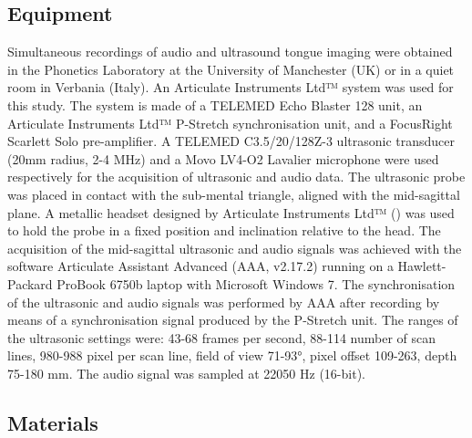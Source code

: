 \documentclass[12pt,]{article}
\begin{document}
\hypertarget{equipment}{%
\subsection{Equipment}\label{equipment}}

\label{s:equipment}

Simultaneous recordings of audio and ultrasound tongue imaging were
obtained in the Phonetics Laboratory at the University of Manchester
(UK) or in a quiet room in Verbania (Italy). An Articulate Instruments
Ltd™ system was used for this study. The system is made of a TELEMED
Echo Blaster 128 unit, an Articulate Instruments Ltd™ P-Stretch
synchronisation unit, and a FocusRight Scarlett Solo pre-amplifier. A
TELEMED C3.5/20/128Z-3 ultrasonic transducer (20mm radius, 2-4 MHz) and
a Movo LV4-O2 Lavalier microphone were used respectively for the
acquisition of ultrasonic and audio data. The ultrasonic probe was
placed in contact with the sub-mental triangle, aligned with the
mid-sagittal plane. A metallic headset designed by Articulate
Instruments Ltd™ (\citeyear{articulate2008}) was used to hold the probe
in a fixed position and inclination relative to the head. The
acquisition of the mid-sagittal ultrasonic and audio signals was
achieved with the software Articulate Assistant Advanced (AAA, v2.17.2)
running on a Hawlett-Packard ProBook 6750b laptop with Microsoft Windows
7. The synchronisation of the ultrasonic and audio signals was performed
by AAA after recording by means of a synchronisation signal produced by
the P-Stretch unit. The ranges of the ultrasonic settings were: 43-68
frames per second, 88-114 number of scan lines, 980-988 pixel per scan
line, field of view 71-93°, pixel offset 109-263, depth 75-180 mm. The
audio signal was sampled at 22050 Hz (16-bit).

\hypertarget{materials}{%
\subsection{Materials}\label{materials}}
\end{document}
